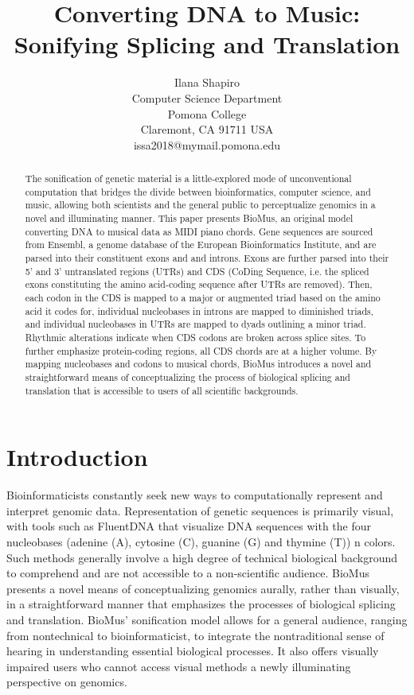\documentclass[letterpaper]{article}
\title{Converting DNA to Music: Sonifying Splicing and Translation}
\author{Ilana Shapiro\\
Computer Science Department\\
Pomona College\\
Claremont, CA 91711 USA\\
issa2018@mymail.pomona.edu\\
}
\begin{document}
 
\maketitle
\begin{abstract}
The sonification of genetic material is a little-explored mode of unconventional computation that bridges the divide between bioinformatics, computer science, and music, allowing both scientists and the general public to perceptualize genomics in a novel and illuminating manner. This paper presents BioMus, an original model converting DNA to musical data as MIDI piano chords. Gene sequences are sourced from Ensembl, a genome database of the European Bioinformatics Institute, and are parsed into their constituent exons and and introns. Exons are further parsed into their 5' and 3' untranslated regions (UTRs) and CDS (CoDing Sequence, i.e. the spliced exons constituting the amino acid-coding sequence after UTRs are removed). Then, each codon in the CDS is mapped to a major or augmented triad based on the amino acid it codes for, individual nucleobases in introns are mapped to diminished triads, and individual nucleobases in UTRs are mapped to dyads outlining a minor triad. Rhythmic alterations indicate when CDS codons are broken across splice sites. To further emphasize protein-coding regions, all CDS chords are at a higher volume. By mapping nucleobases and codons to musical chords, BioMus introduces a novel and straightforward means of conceptualizing the process of biological splicing and translation that is accessible to users of all scientific backgrounds.
\end{abstract}

\section{Introduction}
Bioinformaticists constantly seek new ways to computationally represent and interpret genomic data. Representation of genetic sequences is primarily visual, with tools such as FluentDNA that visualize DNA sequences with the four nucleobases (adenine (A), cytosine (C), guanine (G) and thymine (T)) n colors.
Such methods generally involve a high degree of technical biological background to comprehend and are not accessible to a non-scientific audience. BioMus presents a novel means of conceptualizing genomics aurally, rather than visually, in a straightforward manner that emphasizes the processes of biological splicing and translation. BioMus' sonification model allows for a general audience, ranging from nontechnical to bioinformaticist, to integrate the nontraditional sense of hearing in understanding essential biological processes. It also offers visually impaired users who cannot access visual methods a newly illuminating perspective on genomics.
\end{document}
